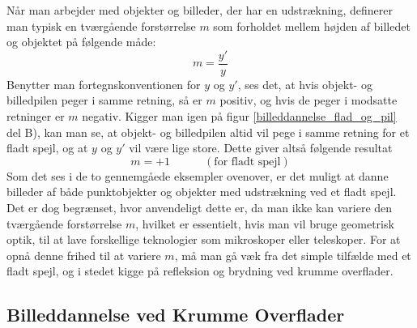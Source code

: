 Når man arbejder med objekter og billeder, der har en udstrækning, definerer man typisk en tværgående forstørrelse $m$ som forholdet mellem højden af billedet og objektet på følgende måde:
\begin{equation}
m = \frac{y'}{y}
\end{equation}
Benytter man fortegnskonventionen for $y$ og $y'$, ses det, at hvis objekt- og billedpilen peger i samme retning, så er $m$ positiv, og hvis de peger i modsatte retninger er $m$ negativ. Kigger man igen på figur \ref{billeddannelse_flad_og_pil} del B), kan man se, at objekt- og billedpilen altid vil pege i samme retning for et fladt spejl, og at $y$ og $y'$ vil være lige store. Dette giver altså følgende resultat
\begin{equation}
m = +1 \quad \quad \quad \left( \text{for fladt spejl} \right)
\end{equation}
Som det ses i de to gennemgåede eksempler ovenover, er det muligt at danne billeder af både punktobjekter og objekter med udstrækning ved et fladt spejl. Det er dog begrænset, hvor anvendeligt dette er, da man ikke kan variere den tværgående forstørrelse $m$, hvilket er essentielt, hvis man vil bruge geometrisk optik, til at lave forskellige teknologier som mikroskoper eller teleskoper. For at opnå denne frihed til at variere $m$, må man gå væk fra det simple tilfælde med et fladt spejl, og i stedet kigge på refleksion og brydning ved krumme overflader.  

\subsection*{Billeddannelse ved Krumme Overflader}


